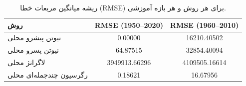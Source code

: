 \begin{table}[htbp]
    \centering
    \begin{tabular}{lcc}
        \hline
        روش & RMSE (1950--2020) & RMSE (1960--2010) \\
        \hline
        نیوتن پیشرو محلی & 0.00000 & 16210.40502 \\
        نیوتن پسرو محلی & 64.87515 & 32854.40094 \\
        لاگرانژ محلی & 3949913.66296 & 4109505.16614 \\
        رگرسیون چندجمله‌ای محلی & 0.18621 & 16.67956 \\
        \hline
    \end{tabular}
    \caption{ریشه میانگین مربعات خطا (RMSE) برای هر روش و هر بازه آموزشی.}
    \label{tab:rmse}
\end{table}
